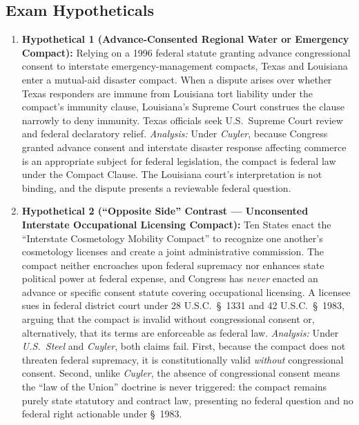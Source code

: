 \documentclass[12pt]{article}
\begin{document}
\subsection{Exam Hypotheticals}
\begin{enumerate}
  \item \textbf{Hypothetical 1 (Advance-Consented Regional Water or Emergency Compact):} Relying on a 1996 federal statute granting advance congressional consent to interstate emergency-management compacts, Texas and Louisiana enter a mutual-aid disaster compact. When a dispute arises over whether Texas responders are immune from Louisiana tort liability under the compact's immunity clause, Louisiana's Supreme Court construes the clause narrowly to deny immunity. Texas officials seek U.S.\ Supreme Court review and federal declaratory relief. \textit{Analysis:} Under \textit{Cuyler}, because Congress granted advance consent and interstate disaster response affecting commerce is an appropriate subject for federal legislation, the compact is federal law under the Compact Clause. The Louisiana court's interpretation is not binding, and the dispute presents a reviewable federal question.
  \item \textbf{Hypothetical 2 (``Opposite Side'' Contrast --- Unconsented Interstate Occupational Licensing Compact):} Ten States enact the ``Interstate Cosmetology Mobility Compact'' to recognize one another's cosmetology licenses and create a joint administrative commission. The compact neither encroaches upon federal supremacy nor enhances state political power at federal expense, and Congress has \textit{never} enacted an advance or specific consent statute covering occupational licensing. A licensee sues in federal district court under 28 U.S.C.\ \S\ 1331 and 42 U.S.C.\ \S\ 1983, arguing that the compact is invalid without congressional consent or, alternatively, that its terms are enforceable as federal law. \textit{Analysis:} Under \textit{U.S.\ Steel} and \textit{Cuyler}, both claims fail. First, because the compact does not threaten federal supremacy, it is constitutionally valid \textit{without} congressional consent. Second, unlike \textit{Cuyler}, the absence of congressional consent means the ``law of the Union'' doctrine is never triggered: the compact remains purely state statutory and contract law, presenting no federal question and no federal right actionable under \S\ 1983.
\end{enumerate}
\end{document}
